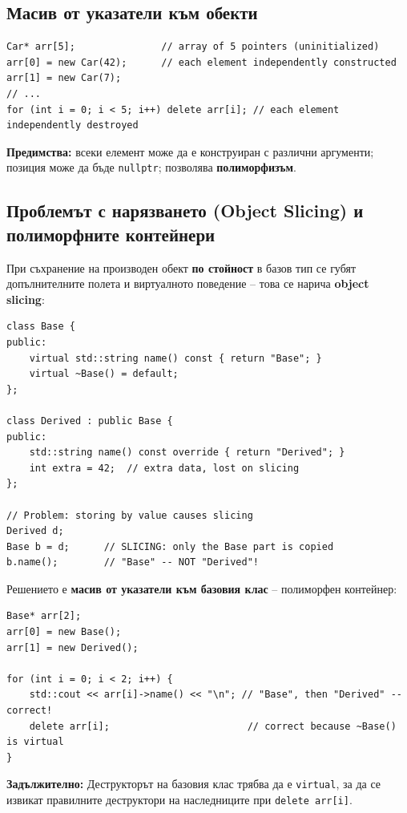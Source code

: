 \documentclass{scrartcl}
\begin{document}
\begin{FlushLeft}
\subsection{Масив от указатели към обекти}

\begin{lstlisting}
Car* arr[5];               // array of 5 pointers (uninitialized)
arr[0] = new Car(42);      // each element independently constructed
arr[1] = new Car(7);
// ...
for (int i = 0; i < 5; i++) delete arr[i]; // each element independently destroyed
\end{lstlisting}

\textbf{Предимства:} всеки елемент може да е конструиран с различни аргументи; позиция може да бъде \texttt{nullptr}; позволява \textbf{полиморфизъм}.

\subsection{Проблемът с нарязването (Object Slicing) и полиморфните контейнери}

При съхранение на производен обект \textbf{по стойност} в базов тип се губят допълнителните полета и виртуалното поведение -- това се нарича \textbf{object slicing}:

\begin{lstlisting}
class Base {
public:
    virtual std::string name() const { return "Base"; }
    virtual ~Base() = default;
};

class Derived : public Base {
public:
    std::string name() const override { return "Derived"; }
    int extra = 42;  // extra data, lost on slicing
};

// Problem: storing by value causes slicing
Derived d;
Base b = d;      // SLICING: only the Base part is copied
b.name();        // "Base" -- NOT "Derived"!
\end{lstlisting}

Решението е \textbf{масив от указатели към базовия клас} -- полиморфен контейнер:

\begin{lstlisting}
Base* arr[2];
arr[0] = new Base();
arr[1] = new Derived();

for (int i = 0; i < 2; i++) {
    std::cout << arr[i]->name() << "\n"; // "Base", then "Derived" -- correct!
    delete arr[i];                        // correct because ~Base() is virtual
}
\end{lstlisting}

\textbf{Задължително:} Деструкторът на базовия клас трябва да е \texttt{virtual}, за да се извикат правилните деструктори на наследниците при \texttt{delete arr[i]}.


\end{FlushLeft}
\end{document}
